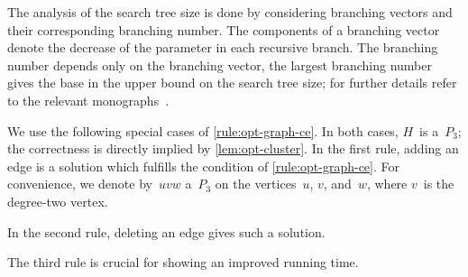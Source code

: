 \documentclass[envcountsame,numbook,smallextended]{svjour3}
\numberwithin{equation}{section}
\numberwithin{figure}{section}
\begin{document}
The analysis of the search tree size is done by considering branching vectors and their corresponding branching number.  The components of a branching vector denote the decrease of the parameter in each recursive branch.  The branching number depends only on the branching vector, the largest branching number gives the base in the upper bound on the search tree size; for further details refer to the relevant monographs~\cite{FK10,Nie06}.

We use the following special cases of \cref{rule:opt-graph-ce}. In both cases, $H$~is a~$P_3$; the correctness is directly implied by \cref{lem:opt-cluster}. In the first rule, adding an edge is a solution which fulfills the condition of \cref{rule:opt-graph-ce}. For convenience, we denote by~$uvw$ a~$P_3$ on the vertices~$u$, $v$, and~$w$, where $v$~is the degree-two vertex.
In the second rule, deleting an edge gives such a solution.
The third rule is crucial for showing an improved running time.
\end{document}
